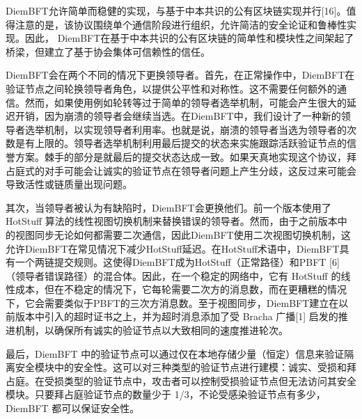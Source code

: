 DiemBFT允许简单而稳健的实现，与基于中本共识的公有区块链实现并行[16]。值得注意的是，该协议围绕单个通信阶段进行组织，允许简洁的安全论证和鲁棒性实现。因此， DiemBFT在基于中本共识的公有区块链的简单性和模块性之间架起了桥梁，但建立了基于协会集体可信赖性的信任。

DiemBFT会在两个不同的情况下更换领导者。首先，在正常操作中，DiemBFT在验证节点之间轮换领导者角色，以提供公平性和对称性。这不需要任何额外的通信。然而，如果使用例如轮转等过于简单的领导者选举机制，可能会产生很大的延迟开销，因为崩溃的领导者会继续当选。在DiemBFT中，我们设计了一种新的领导者选举机制，以实现领导者利用率。也就是说，崩溃的领导者当选为领导者的次数是有上限的。领导者选举机制利用最后提交的状态来实施跟踪活跃验证节点的信誉方案。棘手的部分是就最后的提交状态达成一致。如果天真地实现这个协议，拜占庭式的对手可能会让诚实的验证节点在领导者问题上产生分歧，这反过来可能会导致活性或链质量出现问题。

其次，当领导者被认为有缺陷时，DiemBFT会更换他们。前一个版本使用了 HotStuff 算法的线性视图切换机制来替换错误的领导者。然而，由于之前版本中的视图同步无论如何都需要二次通信，因此DiemBFT使用二次视图切换机制，这允许DiemBFT在常见情况下减少HotStuff延迟。在HotStuff术语中，DiemBFT具有一个两链提交规则。这使得DiemBFT成为HotStuff（正常路径）和PBFT [6]（领导者错误路径）的混合体。因此，在一个稳定的网络中，它有 HotStuff 的线性成本，但在不稳定的情况下，它每轮需要二次方的消息数，而在更糟糕的情况下，它会需要类似于PBFT的三次方消息数。至于视图同步，DiemBFT建立在以前版本中引入的超时证书之上，并为超时消息添加了受 Bracha 广播[1] 启发的推进机制，以确保所有诚实的验证节点以大致相同的速度推进轮次。

最后，DiemBFT 中的验证节点可以通过仅在本地存储少量（恒定）信息来验证隔离安全模块中的安全性。这可以对三种类型的验证节点进行建模：诚实、受损和拜占庭。在受损类型的验证节点中，攻击者可以控制受损验证节点但无法访问其安全模块。只要拜占庭验证节点的数量少于 1/3，不论受感染验证节点有多少，DiemBFT 都可以保证安全性。
